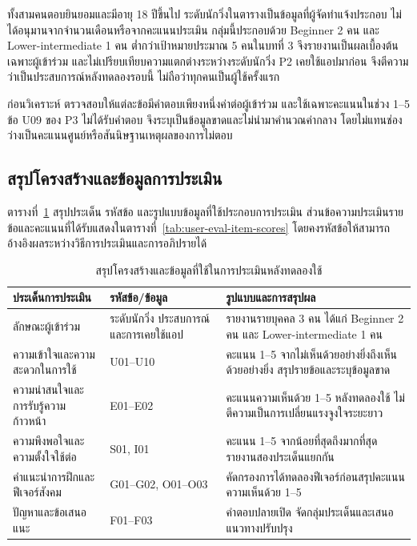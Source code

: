 ทั้งสามคนตอบยินยอมและมีอายุ 18 ปีขึ้นไป ระดับนักวิ่งในตารางเป็นข้อมูลที่ผู้จัดทำแจ้งประกอบ ไม่ได้อนุมานจากจำนวนเดือนหรือจากคะแนนประเมิน กลุ่มนี้ประกอบด้วย Beginner 2 คน และ Lower-intermediate 1 คน ต่ำกว่าเป้าหมายประมาณ 5 คนในบทที่ 3 จึงรายงานเป็นผลเบื้องต้นเฉพาะผู้เข้าร่วม และไม่เปรียบเทียบความแตกต่างระหว่างระดับนักวิ่ง P2 เคยใช้แอปมาก่อน จึงตีความว่าเป็นประสบการณ์หลังทดลองรอบนี้ ไม่ถือว่าทุกคนเป็นผู้ใช้ครั้งแรก

ก่อนวิเคราะห์ ตรวจสอบให้แต่ละข้อมีคำตอบเพียงหนึ่งค่าต่อผู้เข้าร่วม และใช้เฉพาะคะแนนในช่วง 1--5 ข้อ U09 ของ P3 ไม่ได้รับคำตอบ จึงระบุเป็นข้อมูลขาดและไม่นำมาคำนวณค่ากลาง โดยไม่แทนช่องว่างเป็นคะแนนศูนย์หรือสันนิษฐานเหตุผลของการไม่ตอบ

\subsection{สรุปโครงสร้างและข้อมูลการประเมิน}

ตารางที่~\ref{tab:user-eval-framework} สรุปประเด็น รหัสข้อ และรูปแบบข้อมูลที่ใช้ประกอบการประเมิน ส่วนข้อความประเมินรายข้อและคะแนนที่ได้รับแสดงในตารางที่~\ref{tab:user-eval-item-scores} โดยคงรหัสข้อให้สามารถอ้างอิงผลระหว่างวิธีการประเมินและการอภิปรายได้

\begin{table}[H]
\centering\small\setlength{\tabcolsep}{4pt}\renewcommand{\arraystretch}{1.15}
\caption{สรุปโครงสร้างและข้อมูลที่ใช้ในการประเมินหลังทดลองใช้}\label{tab:user-eval-framework}
\begin{tabular}{|>{\raggedright\arraybackslash}p{}|>{\raggedright\arraybackslash}p{}|>{\raggedright\arraybackslash}p{}|}\hline
\textbf{ประเด็นการประเมิน} & \textbf{รหัสข้อ/ข้อมูล} & \textbf{รูปแบบและการสรุปผล} \\ \hline
ลักษณะผู้เข้าร่วม & ระดับนักวิ่ง ประสบการณ์ และการเคยใช้แอป & รายงานรายบุคคล 3 คน ได้แก่ Beginner 2 คน และ Lower-intermediate 1 คน \\ \hline
ความเข้าใจและความสะดวกในการใช้ & U01--U10 & คะแนน 1--5 จากไม่เห็นด้วยอย่างยิ่งถึงเห็นด้วยอย่างยิ่ง สรุปรายข้อและระบุข้อมูลขาด \\ \hline
ความน่าสนใจและการรับรู้ความก้าวหน้า & E01--E02 & คะแนนความเห็นด้วย 1--5 หลังทดลองใช้ ไม่ตีความเป็นการเปลี่ยนแรงจูงใจระยะยาว \\ \hline
ความพึงพอใจและความตั้งใจใช้ต่อ & S01, I01 & คะแนน 1--5 จากน้อยที่สุดถึงมากที่สุด รายงานสองประเด็นแยกกัน \\ \hline
คำแนะนำการฝึกและฟีเจอร์สังคม & G01--G02, O01--O03 & คัดกรองการได้ทดลองฟีเจอร์ก่อนสรุปคะแนนความเห็นด้วย 1--5 \\ \hline
ปัญหาและข้อเสนอแนะ & F01--F03 & คำตอบปลายเปิด จัดกลุ่มประเด็นและเสนอแนวทางปรับปรุง \\ \hline
\end{tabular}
\end{table}


